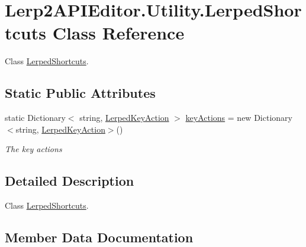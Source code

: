 \hypertarget{class_lerp2_a_p_i_editor_1_1_utility_1_1_lerped_shortcuts}{}\section{Lerp2\+A\+P\+I\+Editor.\+Utility.\+Lerped\+Shortcuts Class Reference}
\label{class_lerp2_a_p_i_editor_1_1_utility_1_1_lerped_shortcuts}


Class \hyperlink{class_lerp2_a_p_i_editor_1_1_utility_1_1_lerped_shortcuts}{Lerped\+Shortcuts}.  


\subsection*{Static Public Attributes}
\begin{DoxyCompactItemize}
\item 
static Dictionary$<$ string, \hyperlink{class_lerp2_a_p_i_editor_1_1_utility_1_1_lerped_key_action}{Lerped\+Key\+Action} $>$ \hyperlink{class_lerp2_a_p_i_editor_1_1_utility_1_1_lerped_shortcuts_a08fef52d30c4f608218f1b472f66ae26}{key\+Actions} = new Dictionary$<$string, \hyperlink{class_lerp2_a_p_i_editor_1_1_utility_1_1_lerped_key_action}{Lerped\+Key\+Action}$>$()
\begin{DoxyCompactList}\small\item\em The key actions \end{DoxyCompactList}\end{DoxyCompactItemize}


\subsection{Detailed Description}
Class \hyperlink{class_lerp2_a_p_i_editor_1_1_utility_1_1_lerped_shortcuts}{Lerped\+Shortcuts}. 



\subsection{Member Data Documentation}
\mbox{\label{class_lerp2_a_p_i_editor_1_1_utility_1_1_lerped_shortcuts_a08fef52d30c4f608218f1b472f66ae26}} 
